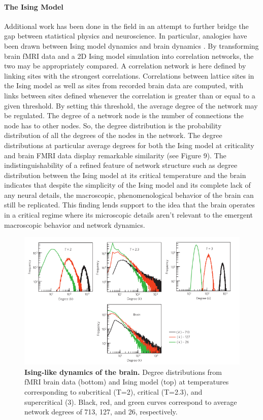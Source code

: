 \documentclass[12pt]{article}
\begin{document}
\paragraph{The Ising Model}
Additional work has been done in the field in an attempt to further bridge the gap between statistical physics and neuroscience. In particular, analogies have been drawn between Ising model dynamics and brain dynamics \cite{Fraiman2009a}. By transforming brain fMRI data and a 2D Ising model simulation into correlation networks, the two may be appropriately compared. A correlation network is here defined by linking sites with the strongest correlations. Correlations between lattice sites in the Ising model as well as sites from recorded brain data are computed, with links between sites defined whenever the correlation is greater than or equal to a given threshold. By setting this threshold, the average degree of the network may be regulated. The degree of a network node is the number of connections the node has to other nodes. So, the degree distribution is the probability distribution of all the degrees of the nodes in the network. The degree distributions at particular average degrees for both the Ising model at criticality and brain FMRI data display remarkable similarity (see Figure 9). The indistinguishability of a refined feature of network structure such as degree distribution between the Ising model at its critical temperature and the brain indicates that despite the simplicity of the Ising model and its complete lack of any neural details, the macroscopic, phenomenological behavior of the brain can still be replicated. This finding lends support to the idea that the brain operates in a critical regime where its microscopic details aren't relevant to the emergent macroscopic behavior and network dynamics.

\begin{figure}      
  \begin{center}    
 \includegraphics[width=.8\textwidth]{isinglikedynamicschialvo}    
    \caption{\textbf{Ising-like dynamics of the brain.} Degree distributions from fMRI brain data (bottom) and Ising model (top) at temperatures corresponding to subcritical (T=2), critical (T=2.3), and supercritical (3). Black, red, and green curves correspond to average network degrees of 713, 127, and 26, respectively. \cite{Fraiman2009a}}   
   \label{Figure::Ising model and the brain at criticality}   
  \end{center}     
   \end{figure}
\end{document}
